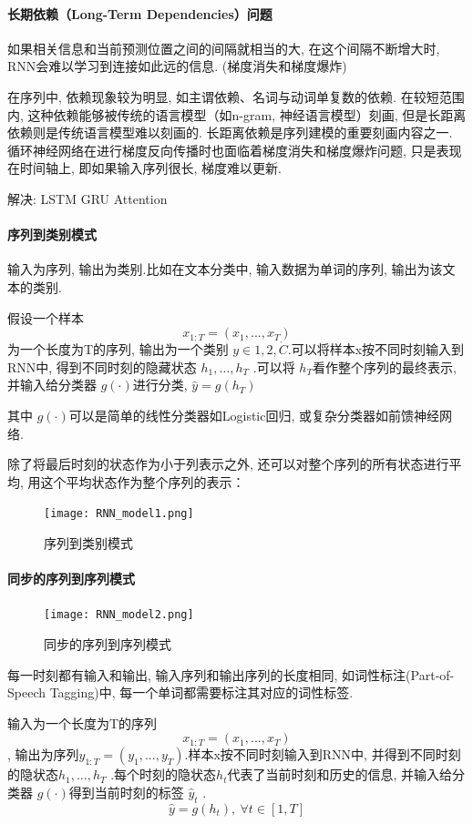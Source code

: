  \paragraph{长期依赖（Long-Term Dependencies）问题}
如果相关信息和当前预测位置之间的间隔就相当的大, 在这个间隔不断增大时,  RNN会难以学习到连接如此远的信息. (梯度消失和梯度爆炸)

在序列中, 依赖现象较为明显, 如主谓依赖、名词与动词单复数的依赖. 在较短范围内, 这种依赖能够被传统的语言模型（如n-gram, 神经语言模型）刻画, 但是长距离依赖则是传统语言模型难以刻画的. 长距离依赖是序列建模的重要刻画内容之一.
循环神经网络在进行梯度反向传播时也面临着梯度消失和梯度爆炸问题, 只是表现在时间轴上, 即如果输入序列很长,  梯度难以更新. 



解决: LSTM GRU Attention


\paragraph{序列到类别模式}

输入为序列, 输出为类别.比如在文本分类中, 输入数据为单词的序列, 输出为该文本的类别.

假设一个样本$$ x_{1:T}=(x_1, ...,  x_T)$$ 为一个长度为T的序列, 输出为一个类别 $y \in {1,  2,  \dot C}$.可以将样本x按不同时刻输入到RNN中, 得到不同时刻的隐藏状态 $h_1,  \dots,  h_T$ .可以将 $h_T$看作整个序列的最终表示, 并输入给分类器 $g(\cdot)$进行分类,  $\hat{y}=g(h_T)$

其中 $g(\cdot)$可以是简单的线性分类器如Logistic回归, 或复杂分类器如前馈神经网络.

除了将最后时刻的状态作为小于列表示之外, 还可以对整个序列的所有状态进行平均, 用这个平均状态作为整个序列的表示：
\begin{figure}[!htb]
    \center
\texttt{[image: RNN\_model1.png]}
\caption{序列到类别模式}
\end{figure}


\paragraph{同步的序列到序列模式}

\begin{figure}[!htb]
    \center
\texttt{[image: RNN\_model2.png]}
\caption{同步的序列到序列模式}
\end{figure}
每一时刻都有输入和输出, 输入序列和输出序列的长度相同, 如词性标注(Part-of-Speech Tagging)中, 每一个单词都需要标注其对应的词性标签.

输入为一个长度为T的序列$$ x_{1:T}=(x_1, ...,  x_T)$$, 输出为序列$y_{1:T}=(y_1, ...,  y_T)$.样本x按不同时刻输入到RNN中, 并得到不同时刻的隐状态$h_1,  \dots,  h_T$ .每个时刻的隐状态$h_t$代表了当前时刻和历史的信息, 并输入给分类器 $g(\cdot)$得到当前时刻的标签 $ \hat{y}_t$ .
$$\hat{y}= g(h_t),  \  \forall t \in [1, T]$$



